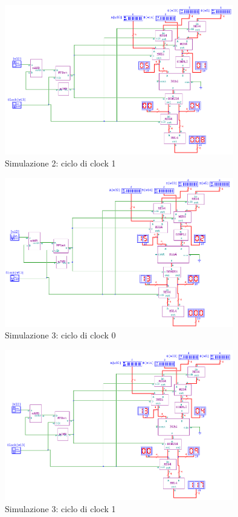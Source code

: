\documentclass[10pt]{article}
\begin{document}
\begin{itemize}
\begin{figure}[H]
    \begin{minipage}[c]{\textwidth}
    \centering
    \includegraphics[width=100mm]{s2c1}
    \caption{Simulazione 2: ciclo di clock 1}
    \label{ }
    \end{minipage}
\end{figure}

\begin{figure}[H]
    \begin{minipage}[c]{\textwidth}
    \centering
    \includegraphics[width=100mm]{s3c0}
    \caption{Simulazione 3: ciclo di clock 0}
    \label{ }
    \end{minipage}
\end{figure}

\begin{figure}[H]
    \begin{minipage}[c]{\textwidth}
    \centering
    \includegraphics[width=100mm]{s3c1}
    \caption{Simulazione 3: ciclo di clock 1}
    \label{ }
    \end{minipage}
\end{figure}


\end{itemize}
\end{document}
